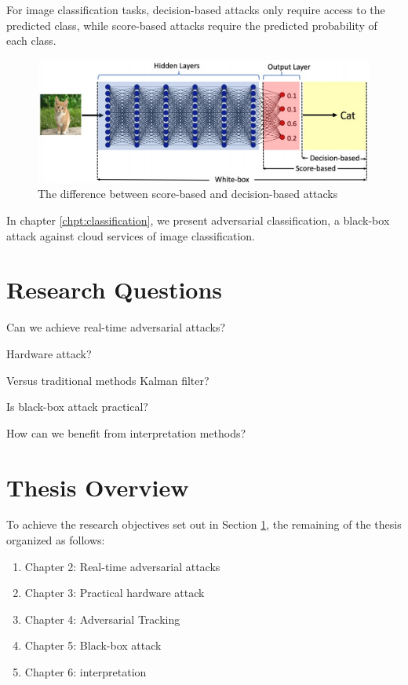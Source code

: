 For image classification tasks, decision-based attacks only require access to the predicted class, while score-based attacks require the predicted probability of each class.

\begin{figure}[H]
\centering
\includegraphics[scale=0.35]{figures/chapter_intro/score-decision.jpg}
\caption{The difference between score-based and decision-based attacks \citep{chen2020hopskipjumpattack}}
\label{fig.decision}
\end{figure}

In chapter \ref{chpt:classification}, we present adversarial classification, a black-box attack against cloud services of image classification.

\section{Research Questions}
\label{sec:research_question}

Can we achieve real-time adversarial attacks?

Hardware attack?

Versus traditional methods Kalman filter?

Is black-box attack practical?

How can we benefit from interpretation methods?

\section{Thesis Overview}

To achieve the research objectives set out in Section \ref{sec:research_question}, the remaining of the thesis organized as follows:

\begin{enumerate}
    \item Chapter 2: Real-time adversarial attacks
    \item Chapter 3: Practical hardware attack
    \item Chapter 4: Adversarial Tracking
    \item Chapter 5: Black-box attack
    \item Chapter 6: interpretation
\end{enumerate}